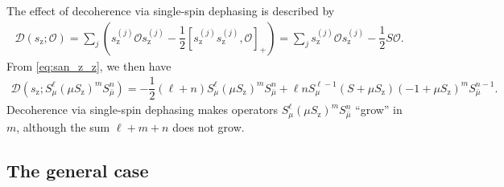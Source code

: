 \documentclass[aps,11pt,notitlepage,nofootinbib,longbibliography]{revtex4-1}
\newcommand{\f}[2]{\dfrac{#1}{#2}} %
\newcommand{\p}[1]{\left(#1\right)} %
\renewcommand{\sp}[1]{\left[#1\right]} %
\newcommand{\D}{\mathcal{D}}
\renewcommand{\O}{\mathcal{O}}
\newcommand{\z}{\text{z}}
\newcommand{\bmu}{{\bar\mu}}
\newcommand{\1}{\mathds{1}}
\begin{document}
The effect of decoherence via single-spin dephasing is described by
\begin{align}
  \D\p{s_\z; \O}
  = \sum_j\p{s_\z^{(j)} \O s_\z^{(j)}
    - \f12\sp{s_\z^{(j)} s_\z^{(j)},\O}_+}
  = \sum_j s_\z^{(j)} \O s_\z^{(j)} - \f12 S \O.
\end{align}
From \eqref{eq:san_z_z}, we then have
\begin{align}
  \D\p{s_\z; S_\mu^\ell \p{\mu S_\z}^m S_\bmu^n}
  = -\f12\p{\ell+n} S_\mu^\ell \p{\mu S_\z}^m S_\bmu^n
  + \ell n S_\mu^{\ell-1} \p{S + \mu S_\z}
  \p{-1 + \mu S_\z}^m S_\bmu^{n-1}.
\end{align}
Decoherence via single-spin dephasing makes operators
$S_\mu^\ell \p{\mu S_\z}^m S_\bmu^n$ ``grow'' in $m$, although the sum
$\ell+m+n$ does not grow.


\subsection{The general case}
\label{sec:general_single}
\end{document}
